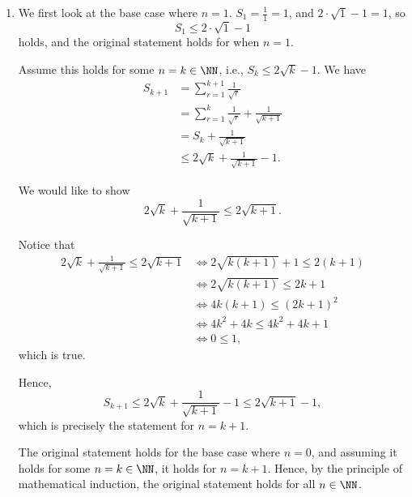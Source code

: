 \Question{\currfilebase}

\begin{enumerate}
    \item We first look at the base case where \(n = 1\). \(S_1 = \frac{1}{1} = 1\), and \(2 \cdot \sqrt{1} - 1 = 1\), so
          \[
              S_1 \leq 2 \cdot \sqrt{1} - 1
          \]
          holds, and the original statement holds for when \(n = 1\).

          Assume this holds for some \(n = k \in \NN\), i.e., \(S_k \leq 2 \sqrt{k} - 1\). We have
          \begin{align*}
              S_{k + 1} & = \sum_{r = 1}^{k + 1} \frac{1}{\sqrt{r}}                      \\
                        & = \sum_{r = 1}^{k} \frac{1}{\sqrt{r}} + \frac{1}{\sqrt{k + 1}} \\
                        & = S_k + \frac{1}{\sqrt{k + 1}}                                 \\
                        & \leq 2 \sqrt{k} + \frac{1}{\sqrt{k + 1}} - 1.
          \end{align*}

          We would like to show
          \[
              2\sqrt{k} + \frac{1}{\sqrt{k + 1}} \leq 2 \sqrt{k + 1}.
          \]

          Notice that
          \begin{align*}
              2\sqrt{k} + \frac{1}{\sqrt{k + 1}} \leq 2 \sqrt{k + 1} & \iff 2\sqrt{k(k + 1)} + 1 \leq 2 (k + 1) \\
                                                                     & \iff 2\sqrt{k(k + 1)} \leq 2k + 1        \\
                                                                     & \iff 4k(k + 1) \leq (2k + 1)^2           \\
                                                                     & \iff 4k^2 + 4k \leq 4k^2 + 4k + 1        \\
                                                                     & \iff 0 \leq 1,
          \end{align*}
          which is true.

          Hence,
          \[
              S_{k + 1} \leq 2 \sqrt{k} + \frac{1}{\sqrt{k + 1}} - 1 \leq 2\sqrt{k + 1} - 1,
          \]
          which is precisely the statement for \(n = k + 1\).

          The original statement holds for the base case where \(n = 0\), and assuming it holds for some \(n = k \in \NN\), it holds for \(n = k + 1\). Hence, by the principle of mathematical induction, the original statement holds for all \(n \in \NN\).


\end{enumerate}
